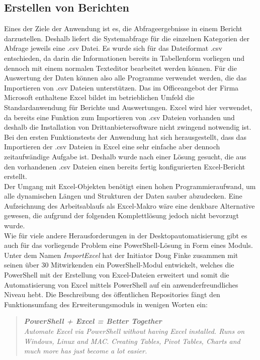 \subsection{Erstellen von Berichten}\label{sec:Bericht}
Eines der Ziele der Anwendung ist es, die Abfrageergebnisse in einem Bericht darzustellen. Deshalb liefert die Systemabfrage für die einzelnen Kategorien der Abfrage jeweils eine .csv Datei. Es wurde sich für das Dateiformat .csv entschieden, da darin die Informationen bereits in Tabellenform vorliegen und dennoch mit einem normalen Texteditor bearbeitet werden können. Für die Auswertung der Daten können also alle Programme verwendet werden, die das Importieren von .csv Dateien unterstützen. Das im Officeangebot der Firma Microsoft enthaltene Excel bildet im betrieblichen Umfeld die Standardanwendung für Berichte und Auswertungen. Excel wird hier verwendet, da bereits eine Funktion zum Importieren von .csv Dateien vorhanden und deshalb die Installation von Drittanbietersoftware nicht zwingend notwendig ist. Bei den ersten Funktionstests der Anwendung hat sich herausgestellt, dass das Importieren der .csv Dateien in Excel eine sehr einfache aber dennoch zeitaufwändige Aufgabe ist. Deshalb wurde nach einer Lösung gesucht, die aus den vorhandenen .csv Dateien einen bereits fertig konfigurierten Excel-Bericht erstellt.\medskip\\
Der Umgang mit Excel-Objekten benötigt einen hohen Programmieraufwand, um alle dynamischen Längen und Strukturen der Daten sauber abzudecken. Eine Aufzeichnung des Arbeitsablaufs als Excel-Makro wäre eine denkbare Alternative gewesen, die aufgrund der folgenden Komplettlösung jedoch nicht bevorzugt wurde.\medskip\\
Wie für viele andere Herausforderungen in der Desktopautomatisierung gibt es auch für das vorliegende Problem eine PowerShell-Lösung in Form eines Moduls. Unter dem Namen \textit{ImportExcel} hat der Initiator Doug Finke zusammen mit seinen über 30 Mitwirkenden ein PowerShell-Modul entwickelt, welches die PowerShell mit der Erstellung von Excel-Dateien erweitert und somit die Automatisierung von Excel mittels PowerShell auf ein anwenderfreundliches Niveau hebt. Die Beschreibung des öffentlichen Repositories fängt den Funktionsumfang des Erweiterungsmoduls in wenigen Worten ein:
\begin{quote}\textit{\glqq \textbf{PowerShell + Excel = Better Together}}\\
\textit{Automate Excel via PowerShell without having Excel installed. Runs on Windows, Linux and MAC. Creating Tables, Pivot Tables, Charts and much more has just become a lot easier.\grqq{} }~\cite{Finke20210710}\end{quote}
